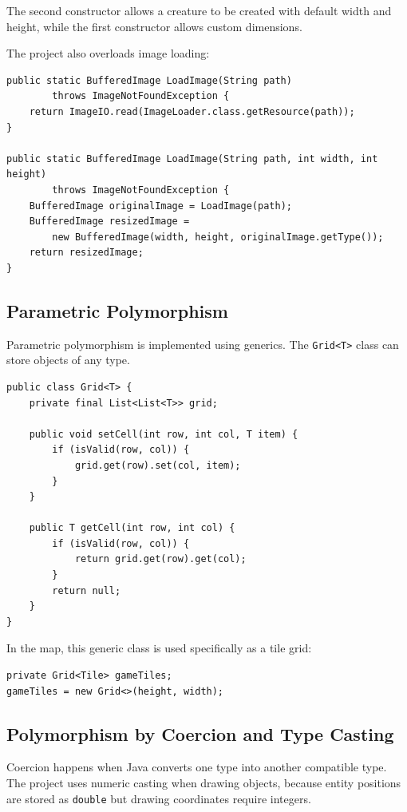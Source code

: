 \documentclass[12pt,a4paper]{article}
\begin{document}
The second constructor allows a creature to be created with default width and height, while the first constructor allows custom dimensions.

The project also overloads image loading:

\begin{lstlisting}
public static BufferedImage LoadImage(String path)
        throws ImageNotFoundException {
    return ImageIO.read(ImageLoader.class.getResource(path));
}

public static BufferedImage LoadImage(String path, int width, int height)
        throws ImageNotFoundException {
    BufferedImage originalImage = LoadImage(path);
    BufferedImage resizedImage =
        new BufferedImage(width, height, originalImage.getType());
    return resizedImage;
}
\end{lstlisting}

\subsection{Parametric Polymorphism}

Parametric polymorphism is implemented using generics. The \texttt{Grid<T>} class can store objects of any type.

\begin{lstlisting}
public class Grid<T> {
    private final List<List<T>> grid;

    public void setCell(int row, int col, T item) {
        if (isValid(row, col)) {
            grid.get(row).set(col, item);
        }
    }

    public T getCell(int row, int col) {
        if (isValid(row, col)) {
            return grid.get(row).get(col);
        }
        return null;
    }
}
\end{lstlisting}

In the map, this generic class is used specifically as a tile grid:

\begin{lstlisting}
private Grid<Tile> gameTiles;
gameTiles = new Grid<>(height, width);
\end{lstlisting}

\subsection{Polymorphism by Coercion and Type Casting}

Coercion happens when Java converts one type into another compatible type. The project uses numeric casting when drawing objects, because entity positions are stored as \texttt{double} but drawing coordinates require integers.
\end{document}
